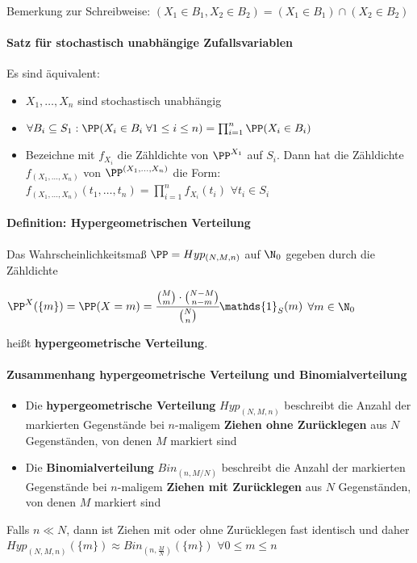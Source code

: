 Bemerkung zur Schreibweise: $(X_1\in B_1, X_2\in B_2) = (X_1\in B_1)\cap(X_2\in B_2)$

\paragraph{Satz für stochastisch unabhängige Zufallsvariablen}
Es sind äquivalent:
\begin{itemize}
	\item $X_1,\ldots,X_n$ sind stochastisch unabhängig
	\item $\forall B_i \subseteq S_1: \PP(X_i\in B_i \;\forall 1\leq i\leq n)=\prod_{i=1}^{n}\PP(X_i\in B_i)$
	\item Bezeichne mit $f_{X_i}$ die Zähldichte von $\PP^{X_1}$ auf $S_i$.
	Dann hat die Zähldichte $f_{(X_1,\ldots,X_n)}$ von $\PP^{(X_1,\ldots,X_n)}$ die Form: $f_{(X_1,\ldots,X_n)}(t_1,\ldots,t_n)=\prod\limits_{i=1}^{n}f_{X_i}(t_i)$ \qquad$\forall t_i\in S_i$
\end{itemize}

\paragraph{Definition: Hypergeometrischen Verteilung}
Das Wahrscheinlichkeitsmaß $\PP =Hyp_{(N,M,n)}$ auf $\N_0$ gegeben durch die Zähldichte
\begin{tightcenter}
	$\PP^X(\{m\})=\PP(X=m)=\cfrac{\binom{M}{m}\cdot\binom{N-M}{n-m}}{\binom{N}{n}}\mathds{1}_S(m)$ \qquad$\forall m\in\N_0$
\end{tightcenter}
heißt \textbf{hypergeometrische Verteilung}.

\paragraph{Zusammenhang hypergeometrische Verteilung und Binomialverteilung}
\begin{itemize}
	\item Die \textbf{hypergeometrische Verteilung} $Hyp_{(N,M,n)}$ beschreibt die Anzahl der markierten Gegenstände bei $n$-maligem \textbf{Ziehen ohne Zurücklegen} aus $N$ Gegenständen, von denen $M$ markiert sind
	\item Die \textbf{Binomialverteilung} $Bin_{(n,M/N)}$ beschreibt die Anzahl der markierten Gegenstände bei $n$-maligem \textbf{Ziehen mit Zurücklegen} aus $N$ Gegenständen, von denen $M$ markiert sind
\end{itemize}
Falls $n\ll N$, dann ist Ziehen mit oder ohne Zurücklegen fast identisch und daher $Hyp_{(N,M,n)}(\{m\})\approx Bin_{(n,\frac{M}{N})}(\{m\})$ \qquad$\forall 0\leq m\leq n$

